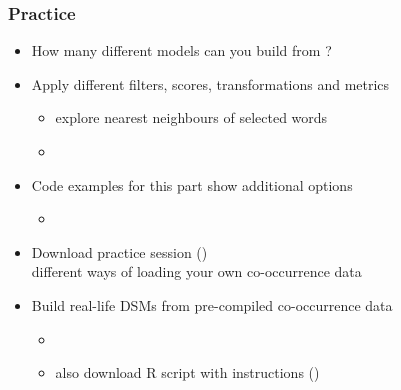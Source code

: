 \documentclass[t]{beamer} %
\begin{document}
\begin{frame}
  \frametitle{Practice}
  \begin{itemize}
  \item How many different models can you build from ?
  \item Apply different filters, scores, transformations and metrics
    \begin{itemize}
    \item[\hand] explore nearest neighbours of selected words
    \item[]
    \end{itemize}
  \item Code examples for this part show additional options
    \begin{itemize}
    \item[]
    \end{itemize}
  \item Download practice session ()\\
    \so different ways of loading your own co-occurrence data
  \item Build real-life DSMs from pre-compiled co-occurrence data
    \begin{itemize}
    \item {}
    \item also download R script with instructions ()
\end{itemize}
  \end{itemize}
\end{frame}



\end{document}
